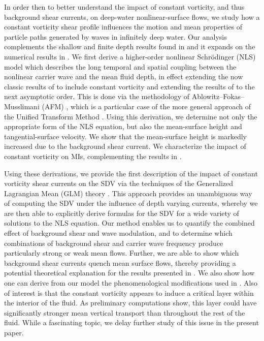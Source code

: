 \documentclass{JFM_Style/jfm}
\begin{document}
In order then to better understand the impact of constant vorticity, and thus background shear currents, on deep-water nonlinear-surface flows, we study how a constant vorticity shear profile influences the motion and mean properties of particle paths generated by waves in infinitely deep water. Our analysis complements the shallow and finite depth results found in \cite{constantin,borluk} and it expands on the numerical results in \cite{nachbin}. We first derive a higher-order nonlinear Schr\"{o}dinger (NLS) model which describes the long temporal and spatial coupling between the nonlinear carrier wave and the mean fluid depth, in effect extending the now classic results of \cite{dysthe} to include constant vorticity and extending the results of \cite{thomas2012nonlinear} to the next asymptotic order.  This is done via the methodology of Ablowitz--Fokas--Musslimani (AFM) \cite{afm,ashton}, which is a particular case of the more general approach of the Unified Transform Method \cite{fokas2008}.  Using this derivation, we determine not only the appropriate form of the NLS equation, but also the mean-surface height and tangential-surface velocity. We show that the mean-surface height is markedly increased due to the background shear current.  We characterize the impact of constant vorticity on MIs, complementing the results in \cite{thomas2012nonlinear}.  %

Using these derivations, we provide the first description of the impact of constant vorticity shear currents on the SDV via the techniques of the Generalized Lagrangian Mean (GLM) theory \cite{andrews,buhler}. This approach provides an unambiguous way of computing the SDV under the influence of depth varying currents, whereby we are then able to explicitly derive formulas for the SDV for a wide variety of solutions to the NLS equation. Our method enables us to quantify the combined effect of background shear and wave modulation, and to determine which combinations of background shear and carrier wave frequency produce particularly strong or weak mean flows.  Further, we are able to show which background shear currents quench mean surface flows, thereby providing a potential theoretical explanation for the results presented in \cite{smith}. We also show how one can derive from our model the phenomenological modifications used in \cite{breivik}. Also of interest is that the constant vorticity appears to induce a critical layer within the interior of the fluid.  As preliminary computations show, this layer could have significantly stronger mean vertical transport than throughout the rest of the fluid.  While a fascinating topic, we delay further study of this issue in the present paper. 
\end{document}
